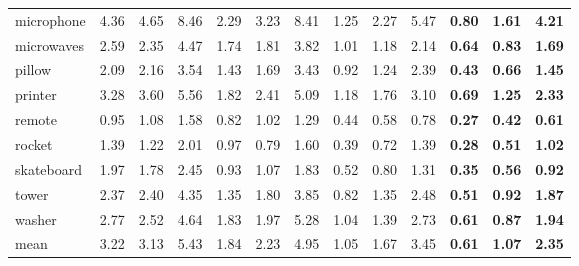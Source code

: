\begin{table*}[t]
\begin{tabular}{l|ccc|ccc|ccc|ccc}
		microphone	& 4.36 & 4.65 & 8.46 & 2.29 & 3.23 & 8.41 & 1.25 & 2.27 & 5.47 & \textbf{0.80} & \textbf{1.61} & \textbf{4.21} \\
		microwaves	& 2.59 & 2.35 & 4.47 & 1.74 & 1.81 & 3.82 & 1.01 & 1.18 & 2.14 & \textbf{0.64} & \textbf{0.83} & \textbf{1.69} \\
		pillow		& 2.09 & 2.16 & 3.54 & 1.43 & 1.69 & 3.43 & 0.92 & 1.24 & 2.39 & \textbf{0.43} & \textbf{0.66} & \textbf{1.45} \\
		printer		& 3.28 & 3.60 & 5.56 & 1.82 & 2.41 & 5.09 & 1.18 & 1.76 & 3.10 & \textbf{0.69} & \textbf{1.25} & \textbf{2.33} \\
		remote		& 0.95 & 1.08 & 1.58 & 0.82 & 1.02 & 1.29 & 0.44 & 0.58 & 0.78 & \textbf{0.27} & \textbf{0.42} & \textbf{0.61} \\
		rocket		& 1.39 & 1.22 & 2.01 & 0.97 & 0.79 & 1.60 & 0.39 & 0.72 & 1.39 & \textbf{0.28} & \textbf{0.51} & \textbf{1.02} \\
		skateboard	& 1.97 & 1.78 & 2.45 & 0.93 & 1.07 & 1.83 & 0.52 & 0.80 & 1.31 & \textbf{0.35} & \textbf{0.56} & \textbf{0.92} \\
		tower		& 2.37 & 2.40 & 4.35 & 1.35 & 1.80 & 3.85 & 0.82 & 1.35 & 2.48 & \textbf{0.51} & \textbf{0.92} & \textbf{1.87} \\
		washer		& 2.77 & 2.52 & 4.64 & 1.83 & 1.97 & 5.28 & 1.04 & 1.39 & 2.73 & \textbf{0.61} & \textbf{0.87} & \textbf{1.94} \\
		\midrule[0.3pt]
		mean		& 3.22 & 3.13 & 5.43 & 1.84 & 2.23 & 4.95 & 1.05 & 1.67 & 3.45 & \textbf{0.61} & \textbf{1.07} & \textbf{2.35} \\
		\bottomrule[1pt]
	\end{tabular}
	
	\label{table:shapenet21_more}
\end{table*}

